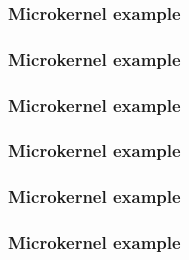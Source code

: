 
\begin{frame}
  \frametitle{Microkernel example}

  \begin{center}
  \end{center}
\end{frame}


\begin{frame}
  \frametitle{Microkernel example}

  \begin{center}
  \end{center}
\end{frame}


\begin{frame}
  \frametitle{Microkernel example}

  \begin{center}
  \end{center}
\end{frame}


\begin{frame}
  \frametitle{Microkernel example}

  \begin{center}
  \end{center}
\end{frame}


\begin{frame}
  \frametitle{Microkernel example}

  \begin{center}
  \end{center}
\end{frame}


\begin{frame}
  \frametitle{Microkernel example}

  \begin{center}
  \end{center}
\end{frame}


%
%

